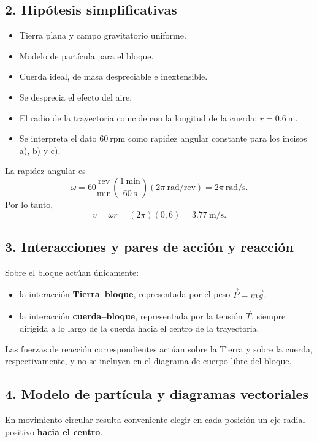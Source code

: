 \documentclass[12pt]{article}
\newcommand{\paso}[2]{%
  \subsection*{\color{AzulFisica}#1. #2}%
}
\begin{document}
\paso{2}{Hipótesis simplificativas}
\begin{itemize}[itemsep=2pt]
  \item Tierra plana y campo gravitatorio uniforme.
  \item Modelo de partícula para el bloque.
  \item Cuerda ideal, de masa despreciable e inextensible.
  \item Se desprecia el efecto del aire.
  \item El radio de la trayectoria coincide con la longitud de la cuerda: $r=\SI{0.6}{\meter}$.
  \item Se interpreta el dato $60\ \text{rpm}$ como rapidez angular constante para los incisos a), b) y c).
\end{itemize}

La rapidez angular es
\[
\omega=60\frac{\text{rev}}{\text{min}}
\left(\frac{1\ \text{min}}{60\ \text{s}}\right)
(2\pi\ \text{rad/rev})=2\pi\ \text{rad/s}.
\]
Por lo tanto,
\[
v=\omega r=(2\pi)(0,6)=\SI{3.77}{\meter\per\second}.
\]

\paso{3}{Interacciones y pares de acción y reacción}
Sobre el bloque actúan únicamente:
\begin{itemize}[itemsep=2pt]
  \item la interacción \textbf{Tierra--bloque}, representada por el peso $\vec P=m\vec g$;
  \item la interacción \textbf{cuerda--bloque}, representada por la tensión $\vec T$, siempre dirigida a lo largo de la cuerda hacia el centro de la trayectoria.
\end{itemize}

Las fuerzas de reacción correspondientes actúan sobre la Tierra y sobre la cuerda, respectivamente, y no se incluyen en el diagrama de cuerpo libre del bloque.

\paso{4}{Modelo de partícula y diagramas vectoriales}
En movimiento circular resulta conveniente elegir en cada posición un eje radial positivo \textbf{hacia el centro}.
\end{document}
